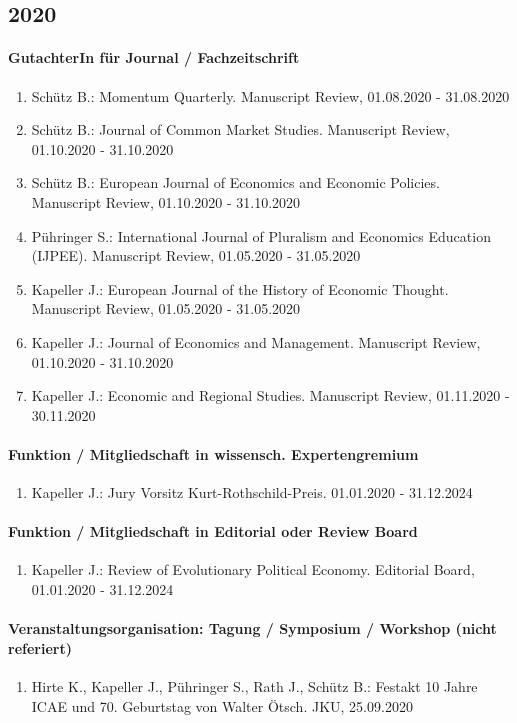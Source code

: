 \subsection*{2020} 
\paragraph{GutachterIn für Journal / Fachzeitschrift} 
\begin{enumerate}[leftmargin=*, labelsep=0.5cm] 
 	 \item Schütz B.: Momentum Quarterly. Manuscript Review, 01.08.2020 - 31.08.2020 
	 \item Schütz B.: Journal of Common Market Studies. Manuscript Review, 01.10.2020 - 31.10.2020 
	 \item Schütz B.: European Journal of Economics and Economic Policies. Manuscript Review, 01.10.2020 - 31.10.2020 
	 \item Pühringer S.: International Journal of Pluralism and Economics Education (IJPEE). Manuscript Review, 01.05.2020 - 31.05.2020 
	 \item Kapeller J.: European Journal of the History of Economic Thought. Manuscript Review, 01.05.2020 - 31.05.2020 
	 \item Kapeller J.: Journal of Economics and Management. Manuscript Review, 01.10.2020 - 31.10.2020 
	 \item Kapeller J.: Economic and Regional Studies. Manuscript Review, 01.11.2020 - 30.11.2020 
\end{enumerate} 
\paragraph{Funktion / Mitgliedschaft in wissensch. Expertengremium} 
\begin{enumerate}[leftmargin=*, labelsep=0.5cm] 
 	 \item Kapeller J.: Jury Vorsitz Kurt-Rothschild-Preis. 01.01.2020 - 31.12.2024 
\end{enumerate} 
\paragraph{Funktion / Mitgliedschaft in Editorial oder Review Board} 
\begin{enumerate}[leftmargin=*, labelsep=0.5cm] 
 	 \item Kapeller J.: Review of Evolutionary Political Economy. Editorial Board, 01.01.2020 - 31.12.2024 
\end{enumerate} 
\paragraph{Veranstaltungsorganisation: Tagung / Symposium / Workshop (nicht referiert)} 
\begin{enumerate}[leftmargin=*, labelsep=0.5cm] 
 	 \item Hirte K., Kapeller J., Pühringer S., Rath J., Schütz B.: Festakt 10 Jahre ICAE und 70. Geburtstag von Walter Ötsch. JKU, 25.09.2020 
\end{enumerate} 
